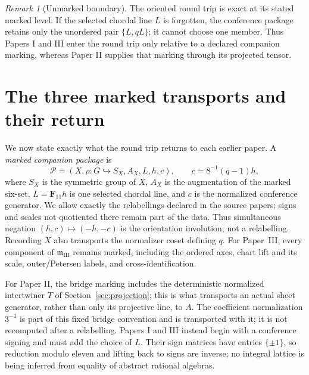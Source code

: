 \documentclass[11pt]{article}
\theoremstyle{definition}
\theoremstyle{remark}
\newtheorem{remark}[theorem]{Remark}
\newcommand{\F}{\mathbf F}
\begin{document}
\begin{remark}[Unmarked boundary]
\label{rem:unmarked-boundary}
The oriented round trip is exact at its stated marked level.  If the selected
chordal line \(L\) is forgotten, the conference package retains only the
unordered pair \(\{L,qL\}\); it cannot choose one member.  Thus Papers I and
III enter the round trip only relative to a declared companion marking,
whereas Paper II supplies that marking through its projected tensor.
\end{remark}

\section{The three marked transports and their return}
\label{sec:three-transports}

We now state exactly what the round trip returns to each earlier paper.  A
\emph{marked companion package} is
\[
 \mathcal P=(X,\rho:G\hookrightarrow S_X,A_X,L,h,c),
 \qquad c=8^{-1}(q-1)h,
\]
where \(S_X\) is the symmetric group of \(X\), \(A_X\) is the augmentation
of the marked six-set,
\(L=\F_{11}h\) is one selected chordal line, and \(c\) is the normalized
conference generator.  We allow exactly the relabellings declared in the
source papers; signs and scales not quotiented there remain part of the
data.  Thus simultaneous negation \((h,c)\mapsto(-h,-c)\) is the orientation
involution, not a relabelling.  Recording \(X\) also transports the
normalizer coset defining \(q\).  For Paper~III, every component of
\(\mathfrak m_{\mathrm{III}}\) remains marked, including the ordered axes,
chart lift and its scale, outer/Petersen labels, and cross-identification.

For Paper II, the bridge marking includes the deterministic normalized
intertwiner \(T\) of Section~\ref{sec:projection}; this is what transports an
actual sheet generator, rather than only its projective line, to \(A\).
The coefficient normalization \(3^{-1}\) is part of this fixed bridge
convention and is transported with it; it is not recomputed after a
relabelling.
Papers I and III instead begin with a conference signing and must add the
choice of \(L\).  Their sign matrices have entries \(\{\pm1\}\), so reduction
modulo eleven and lifting back to signs are inverse; no integral lattice is
being inferred from equality of abstract rational algebras.
\end{document}
